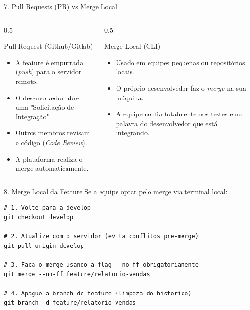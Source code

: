 \documentclass[aspectratio=169]{beamer}
\begin{document}
\begin{frame}{7. Pull Requests (PR) vs Merge Local}
    \begin{columns}[T]
        \begin{column}{0.5\textwidth}
            \begin{block}{Pull Request (Github/Gitlab)}
                \begin{itemize}
                    \item A feature é empurrada (\textit{push}) para o servidor remoto.
                    \item O desenvolvedor abre uma "Solicitação de Integração".
                    \item Outros membros revisam o código (\textit{Code Review}).
                    \item A plataforma realiza o merge automaticamente.
                \end{itemize}
            \end{block}
        \end{column}
        \begin{column}{0.5\textwidth}
            \begin{block}{Merge Local (CLI)}
                \begin{itemize}
                    \item Usado em equipes pequenas ou repositórios locais.
                    \item O próprio desenvolvedor faz o \textit{merge} na sua máquina.
                    \item A equipe confia totalmente nos testes e na palavra do desenvolvedor que está integrando.
                \end{itemize}
            \end{block}
        \end{column}
    \end{columns}
\end{frame}

\begin{frame}[fragile]{8. Merge Local da Feature}
    Se a equipe optar pelo merge via terminal local:
    \vspace{0.3cm}
\begin{lstlisting}
# 1. Volte para a develop
git checkout develop

# 2. Atualize com o servidor (evita conflitos pre-merge)
git pull origin develop

# 3. Faca o merge usando a flag --no-ff obrigatoriamente
git merge --no-ff feature/relatorio-vendas

# 4. Apague a branch de feature (limpeza do historico)
git branch -d feature/relatorio-vendas
\end{lstlisting}
\end{frame}
\end{document}
